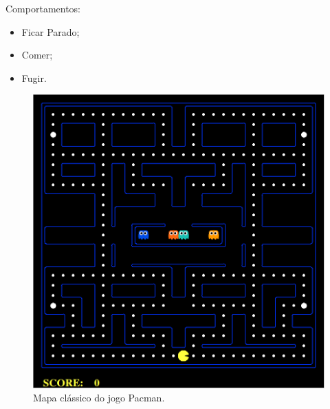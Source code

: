 \documentclass{beamer}
\begin{document}
\begin{frame}
Comportamentos:
\begin{itemize}
	\item Ficar Parado;
	\item Comer;
	\item Fugir.
\end{itemize}

\begin{figure}[h]
    \centering
    \includegraphics[height=0.6\textheight]{images/pacman_classical_map}
    \caption{Mapa clássico do jogo Pacman.}
    \label{img:PlataformaPacmanMapaClassico}
\end{figure}
\end{frame}

\end{document}
